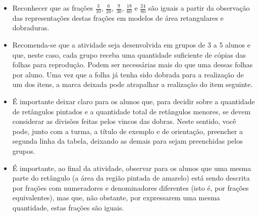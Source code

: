 \begin{multicols}{2}
\begin{solucao}[code={\setcounter{tcb@cnt@solucao}{0}}]{}{}
\end{solucao}





\begin{objetivos}[label=chap4-ativ2]{}{}
\begin{itemize} %
    \item       Reconhecer que as frações       $\frac{3}{10}$,
$\frac{6}{20}$, $\frac{9}{30}$, $\frac{18}{60}$ e $\frac{24}{80}$ são
iguais a partir da observação das representações destas frações em modelos de
área retangulares e dobraduras.
\end{itemize} %
\end{objetivos}

\begin{orientacoes}{}{}

\begin{itemize} %
    \item       Recomenda-se que a atividade seja desenvolvida em grupos de 3 a
5 alunos e que, neste caso, cada grupo receba uma quantidade suficiente de
cópias das             folhas para reprodução. Podem ser necessárias mais
do que uma dessas folhas por aluno. Uma vez que a folha já tenha sido dobrada
para a realização de um dos itens, a marca deixada pode atrapalhar a realização
do item seguinte.
    \item       É importante deixar claro para os alunos que, para decidir sobre
a quantidade de retângulos pintados e a quantidade total de retângulos menores, se devem considerar as divisões feitas pelos vincos das dobras. Neste sentido, você pode,
junto com a turma, a título de exemplo e de orientação, preencher a segunda
linha da tabela, deixando as demais para sejam preenchidas pelos grupos.
    \item       É importante, ao final da atividade, observar para os alunos que
uma mesma parte do retângulo (a área da região pintada de amarelo) está sendo
descrita por frações com numeradores e denominadores diferentes (isto é, por
frações equivalentes), mas que, não obstante, por expressarem uma mesma
quantidade, estas frações são iguais.
\end{itemize} %


   \vspace{.1cm}


\end{orientacoes}
  \end{multicols}
  \pagebreak

